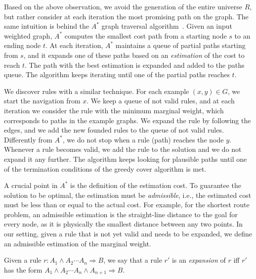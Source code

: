 		\vspace{0.5ex}
Based on the above observation, we avoid the generation of the entire universe $R$, but rather consider at each iteration the most promising path on the graph. The same intuition  is behind 
the $A^*$ graph traversal algorithm~\cite{hart1968formal}. 
Given an input weighted graph, $A^*$ computes the smallest cost path from a starting node $s$ to an ending node $t$. At each iteration, $A^*$ maintains a queue of partial paths starting from $s$, and it expands one of these paths based on an \emph{estimation} of the cost to reach $t$. The path with the best estimation is expanded and added to the paths queue. The algorithm keeps iterating until one of the partial paths reaches $t$. 

We discover rules with a similar technique. For each example $(x,y) \in G$, we start the navigation from $x$. We keep a queue of not valid rules, %
and at each iteration we consider the rule with the minimum marginal weight, which corresponds to paths in the example graphs. 
We expand the rule by following the edges, and we add the new founded rules to the queue of not valid rules. Differently from $A^*$, we do not stop when a rule (path) reaches the node $y$. Whenever a rule becomes valid, we add the rule to the solution and we do not expand it any further. The algorithm keeps looking for plausible paths until one of the termination conditions of the greedy cover algorithm is met. %

A crucial point in $A^*$ is the definition of the estimation cost. To guarantee the solution to be optimal, the estimation must be \emph{admissible}, i.e., the estimated cost must be less than or equal to the actual cost. 
For example, for the shortest route problem, an admissible estimation is the straight-line distance to the goal for every node, as it is physically the smallest distance between any two points. In our setting, given a rule that is not yet valid and needs to be expanded, we define an admissible estimation of the marginal weight.

\begin{definition}
	Given a rule $r : A_1 \wedge A_2 \cdots A_n \Rightarrow B$, we say that a rule $r'$ is an \emph{expansion} of $r$ iff $r'$ has the form $A_1 \wedge A_2 \cdots A_n \wedge A_{n+1} \Rightarrow B$. %
\end{definition}

